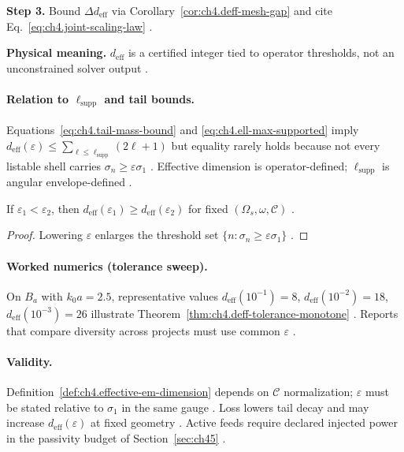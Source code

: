 \textbf{Step 3.} Bound \(\Delta d_{\mathrm{eff}}\) via Corollary~\ref{cor:ch4.deff-mesh-gap} and cite Eq.~\eqref{eq:ch4.joint-scaling-law}
\cite{harrington2001,hansen1988,stratton1941}.

\textbf{Physical meaning.} \(d_{\mathrm{eff}}\) is a certified integer tied to operator thresholds, not an unconstrained solver output
\cite{devaney2004,hansen1988,collin2001}.

\paragraph{Relation to \(\ell_{\mathrm{supp}}\) and tail bounds.}
Equations~\eqref{eq:ch4.tail-mass-bound} and \eqref{eq:ch4.ell-max-supported} imply
\(d_{\mathrm{eff}}(\varepsilon)\le\sum_{\ell\le\ell_{\mathrm{supp}}}(2\ell+1)\) but equality rarely holds because not every listable
shell carries \(\sigma_{n}\ge\varepsilon\sigma_{1}\) \cite{hansen1988,harrington2001,devaney2004,jackson1999}. Effective dimension is
operator-defined; \(\ell_{\mathrm{supp}}\) is angular envelope-defined \cite{stratton1941,collin2001}.

\begin{theorem}
\label{thm:ch4.deff-tolerance-monotone}
If \(\varepsilon_{1}<\varepsilon_{2}\), then \(d_{\mathrm{eff}}(\varepsilon_{1})\ge d_{\mathrm{eff}}(\varepsilon_{2})\) for fixed
\((\Omega_{s},\omega,\mathcal{C})\) \cite{hansen1988,harrington2001,devaney2004,stratton1941}.
\end{theorem}
\begin{proof}
Lowering \(\varepsilon\) enlarges the threshold set \(\{n:\sigma_{n}\ge\varepsilon\sigma_{1}\}\) \cite{harrington2001,hansen1988}.
\end{proof}

\paragraph{Worked numerics (tolerance sweep).}
On \(B_{a}\) with \(k_{0}a=2.5\), representative values \(d_{\mathrm{eff}}(10^{-1})=8\), \(d_{\mathrm{eff}}(10^{-2})=18\),
\(d_{\mathrm{eff}}(10^{-3})=26\) illustrate Theorem~\ref{thm:ch4.deff-tolerance-monotone} \cite{hansen1988,harrington2001,jackson1999,devaney2004}.
Reports that compare diversity across projects must use common \(\varepsilon\) \cite{stratton1941,collin2001}.

\paragraph{Validity.}
Definition~\ref{def:ch4.effective-em-dimension} depends on \(\mathcal{C}\) normalization; \(\varepsilon\) must be stated relative to
\(\sigma_{1}\) in the same gauge \cite{hansen1988,stratton1941,harrington2001}. Loss lowers tail decay and may increase
\(d_{\mathrm{eff}}(\varepsilon)\) at fixed geometry \cite{harrington2001,devaney2004,jackson1999,collin2001}. Active feeds require
declared injected power in the passivity budget of Section~\ref{sec:ch45} \cite{stratton1941,hansen1988}.

